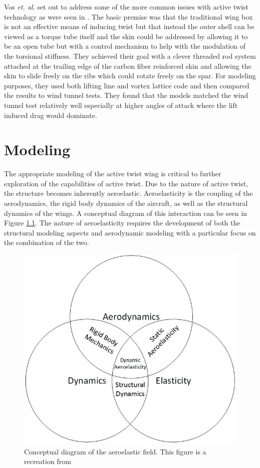 \documentclass[11pt]{ucthesis}
\begin{document}
Vos \textit{et. al.}\cite{vos2010mechanism} set out to address some of the more common issues with active twist technology as were seen in \cite{majji2007design}. The basic premise was that the traditional wing box is not an effective means of inducing twist but that instead the outer shell can be viewed as a torque tube itself and the skin could be addressed by allowing it to be an open tube but with a control mechanism to help with the modulation of the torsional stiffness. They achieved their goal with a clever threaded rod system attached at the trailing edge of the carbon fiber reinforced skin and allowing the skin to slide freely on the ribs which could rotate freely on the spar. For modeling purposes, they used both lifting line and vortex lattice code and then compared the results to wind tunnel tests. They found that the models matched the wind tunnel test relatively well especially at higher angles of attack where the lift induced drag would dominate. 


\chapter{Modeling}
\label{sec:modeling}
The appropriate modeling of the active twist wing is critical to further exploration of the capabilities of active twist. Due to the nature of active twist, the structure becomes inherently aeroelastic. Aeroelasticity is the coupling of the aerodynamics, the rigid body dynamics of the aircraft, as well as the structural dynamics of the wings. A conceptual diagram of this interaction can be seen in Figure \ref{fig:AEDiag}. The nature of aeroelasticity requires the development of both the structural modeling aspects and aerodynamic modeling with a particular focus on the combination of the two.

\begin{figure}[thpb]
\centering
\includegraphics[width=0.4\linewidth]{Figures/AeroelasticConceptDiagram.jpg}
\caption{Conceptual diagram of the aeroelastic field. This figure is a recreation from \cite{hodges2011introduction}}
\label{fig:AEDiag} 
\end{figure}
\end{document}
